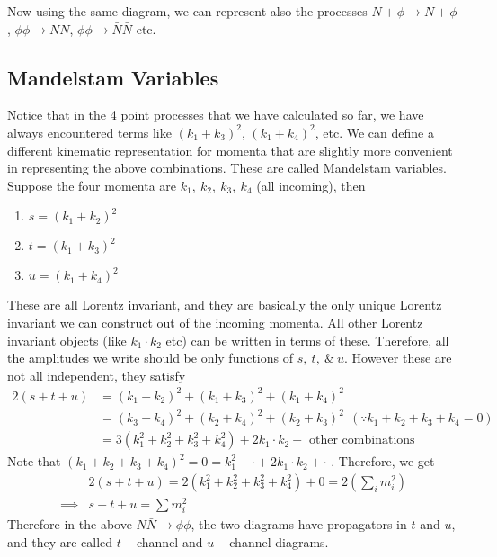 \documentclass[11pt, notitlepage]{report}
\numberwithin{equation}{section}
\begin{document}
    Now using the same diagram, we can represent also the processes \(N+\phi \to N + \phi\), \(\phi\phi\to N N\), \(\phi\phi\to \bar N \bar N\) etc.

    \subsection{Mandelstam Variables}
    Notice that in the 4 point processes that we have calculated so far, we have always encountered terms like \((k_1 + k_3)^2\), \((k_1 + k_4)^2\), etc. We can define a different kinematic representation for momenta that are slightly more convenient in representing the above combinations. These are called Mandelstam variables.\\

    Suppose the four momenta are \(k_1,~k_2,~k_3,~k_4\) (all incoming), then 
    \begin{enumerate}
        \item \(s = (k_1 + k_2)^2\)
        \item \(t = (k_1 + k_3)^2\)
        \item \(u = (k_1 + k_4)^2\)
    \end{enumerate}

    These are all Lorentz invariant, and they are basically the only unique Lorentz invariant we can construct out of the incoming momenta. All other Lorentz invariant objects (like \(k_1\cdot k_2\) etc) can be written in terms of these. Therefore, all the amplitudes we write should be only functions of \(s,~t,~\& ~u\). However these are not all independent, they satisfy 
    \begin{align*}
        2(s+t+u) &= (k_1 + k_2)^2 + (k_1 + k_3)^2 + (k_1 + k_4)^2\\
            &=(k_3 + k_4)^2 + (k_2 + k_4)^2 + (k_2 + k_3)^2~~(\because k_1 + k_2 + k_3 + k_4 = 0)\\
            &= 3(k_1^2 + k_2^2 + k_3^2 + k_4^2 ) + 2k_1\cdot k_2 + \text{~other combinations}
    \end{align*}
    Note that \((k_1 + k_2 + k_3 + k_4)^2  = 0 = k_1^2 +\cdot+2k_1 \cdot k_2 + \cdot \) . Therefore, we get 
    \begin{align*}
        &2(s+t+u) = 2(k_1^2 + k_2^2 + k_3^2 + k_4^2) + 0 = 2(\sum_i m_i^2)\\
        \implies & s+t+u = \sum m_i^2
    \end{align*}
    Therefore in the above \(N\bar N \to \phi\phi\), the two diagrams have propagators in \(t\) and \(u\), and they are called \(t-\)channel and \(u-\)channel diagrams.\\
\end{document}
